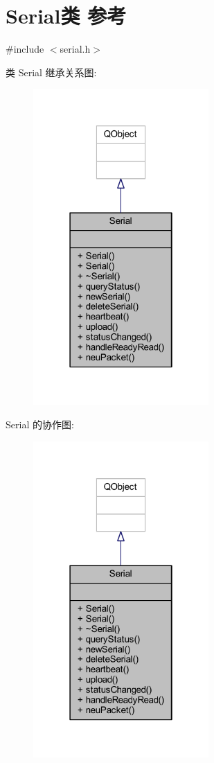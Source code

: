 \hypertarget{class_serial}{}\section{Serial类 参考}
\label{class_serial}


{\ttfamily \#include $<$serial.\+h$>$}



类 Serial 继承关系图\+:
\nopagebreak
\begin{figure}[H]
\begin{center}
\leavevmode
\includegraphics[width=190pt]{class_serial__inherit__graph}
\end{center}
\end{figure}


Serial 的协作图\+:
\nopagebreak
\begin{figure}[H]
\begin{center}
\leavevmode
\includegraphics[width=190pt]{class_serial__coll__graph}
\end{center}
\end{figure}
